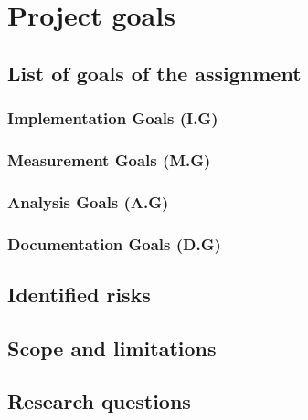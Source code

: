 \chapter{Project goals}\label{chapter:first_real_chapter}

\section{List of goals of the assignment}
\subsection{Implementation Goals (I.G)}
\subsection{Measurement Goals (M.G)}
\subsection{Analysis Goals (A.G)}
\subsection{Documentation Goals (D.G)}
\section{Identified risks}
\section{Scope and limitations}
\section{Research questions}
